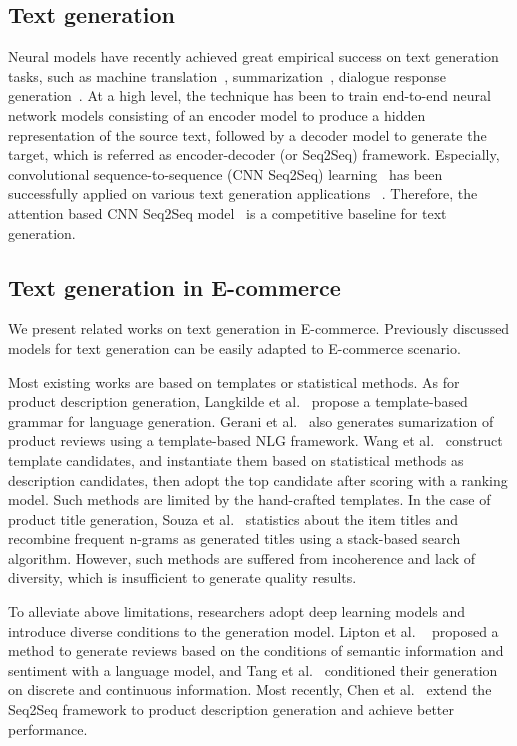 \subsection{Text generation}
\label{sec:textgen}
Neural models have recently achieved great empirical success on text generation tasks,
such as machine translation~\cite{bahdanau2014neural,wu2016google},
summarization~\cite{chopra2016abstractive,nallapati2016abstractive},
dialogue response generation~\cite{serban2017multiresolution}.
At a high level, the technique has been to train end-to-end neural network models
consisting of an encoder model to produce a hidden representation of the source text, 
followed by a decoder model to generate the target, which is referred as 
encoder-decoder (or Seq2Seq) framework.
Especially, convolutional sequence-to-sequence (CNN Seq2Seq) learning~\cite{gehring2017convolutional}
has been successfully applied on various text generation applications
~\cite{wu2019pay,narayan2018don,baevski2018adaptive,dinan2018wizard}.
Therefore, the attention based CNN Seq2Seq model~\cite{ott2019fairseq} 
is a competitive baseline for text generation.

\subsection{Text generation in E-commerce}
We present related works on text generation in E-commerce.
Previously discussed models for text generation can be easily adapted to E-commerce scenario.

Most existing works are based on templates or statistical methods.
As for product description generation, 
Langkilde et al.~\cite{langkilde1998generation} propose a 
template-based grammar for language generation.
Gerani et al.~\cite{gerani2014abstractive} also generates sumarization of product reviews
using a template-based NLG framework.
Wang et al.~\cite{wang2017statistical} construct template candidates, and instantiate them  
based on statistical methods as description candidates,
then adopt the top candidate after scoring with a ranking model. 
Such methods are limited by the hand-crafted templates.
In the case of product title generation, 
Souza et al.~\cite{de2018generating} statistics about the item titles and
recombine frequent n-grams as generated titles using a stack-based search algorithm. 
However, such methods are suffered from incoherence and lack of diversity, 
which is insufficient to generate quality results.

To alleviate above limitations, researchers adopt deep learning models 
and introduce diverse conditions to the generation model. 
Lipton et al. ~\cite{lipton2015capturing} proposed a method to generate reviews 
based on the conditions of semantic information and sentiment with a language model, 
and Tang et al.~\cite{tang2016context} 
conditioned their generation on discrete and continuous information. 
Most recently, Chen et al.~\cite{ChenLZYZ019} extend the Seq2Seq framework
to product description generation and achieve better performance. 


